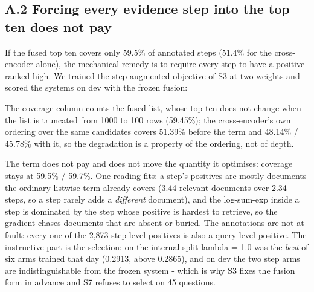 \documentclass[11pt]{article}
\begin{document}
\subsection*{A.2 Forcing every evidence step into the top ten does not pay}
If the fused top ten covers only 59.5\% of annotated steps (51.4\% for the cross-encoder alone), the mechanical remedy is to require every step to have a positive ranked high. We trained the step-augmented objective of S3 at two weights and scored the systems on dev with the frozen fusion:

\begin{table}[t]
\centering
\scriptsize
{}%
\end{table}

The coverage column counts the fused list, whose top ten does not change when the list is truncated from 1000 to 100 rows (59.45\%); the cross-encoder’s own ordering over the same candidates covers 51.39\% before the term and 48.14\% / 45.78\% with it, so the degradation is a property of the ordering, not of depth.

The term does not pay and does not move the quantity it optimises: coverage stays at 59.5\% / 59.7\%. One reading fits: a step’s positives are mostly documents the ordinary listwise term already covers (3.44 relevant documents over 2.34 steps, so a step rarely adds a \emph{different} document), and the log-sum-exp inside a step is dominated by the step whose positive is hardest to retrieve, so the gradient chases documents that are absent or buried. The annotations are not at fault: every one of the 2,873 step-level positives is also a query-level positive. The instructive part is the selection: on the internal split lambda = 1.0 was the \emph{best} of six arms trained that day (0.2913, above 0.2865), and on dev the two step arms are indistinguishable from the frozen system - which is why S3 fixes the fusion form in advance and S7 refuses to select on 45 questions.
\end{document}
